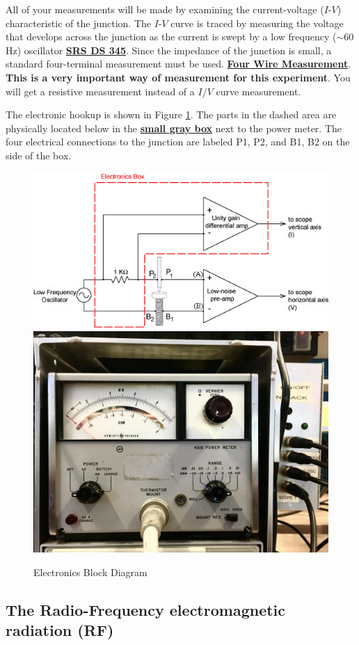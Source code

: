 \documentclass{../lab}
\begin{document}
All of your measurements will be made by examining the current-voltage ($I$-$V$) characteristic of the junction. The $I$-$V$ curve is traced by measuring the voltage that develops across the junction as the current is swept by a low frequency ($\sim$60 Hz) oscillator \href{https://youtu.be/PrM8DHFOFS0}{\textbf{SRS DS 345}}. Since the impedance of the junction is small, a standard four-terminal measurement must be used. \href{http://physics111.lib.berkeley.edu/Physics111/Reprints/JOS/10-Four\_Wire\_Measurement.pdf}{\textbf{Four Wire Measurement}}. \textbf{This is a very important way of measurement for this experiment}. You will get a resistive measurement instead of a $I/V$ curve measurement.

The electronic hookup is shown in Figure \ref{fig:ElectronicsBlockDiagram}. The parts in the dashed area are physically located below in the  \href{http://experimentationlab.berkeley.edu/sites/default/files/JOS/image.jpeg}{\textbf{small gray box}} next to the power meter. The four electrical connections to the junction are labeled P1, P2, and B1, B2 on the side of the box.

\begin{figure}[h]
    \href{http://experimentationlab.berkeley.edu/sites/default/files/images/JOS7.gif}{\includegraphics[width=0.6\linewidth]{images/JOS7.png}}\hfill
    \href{http://experimentationlab.berkeley.edu/sites/default/files/JOS/image.jpeg}{\includegraphics[width=0.39\linewidth]{images/image.jpg}}
    \caption{Electronics Block Diagram}
    \label{fig:ElectronicsBlockDiagram}
\end{figure}

\subsection{The Radio-Frequency electromagnetic radiation (RF)}
\end{document}
